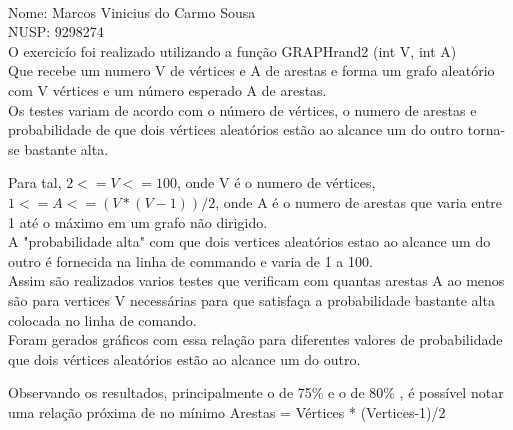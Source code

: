 \documentclass{article}
\begin{document}
\quad\\
Nome: Marcos Vinicius do Carmo Sousa\\
NUSP: 9298274\\

O exercicío foi realizado utilizando a função GRAPHrand2 (int V, int A)\\
Que recebe um numero V de vértices e A de arestas e forma um grafo aleatório
com V vértices e um número esperado A de arestas.\\
Os testes variam de acordo com o número de vértices, o numero de arestas e \\
probabilidade de que dois vértices aleatórios estão ao alcance um do outro torna-se bastante alta.

Para tal, $2<=V<=100$, onde V é o numero de vértices, $1<=A<=(V*(V-1))/2$, onde A é o numero de arestas que varia entre 1 até o máximo em um grafo não dirigido.\\
A "probabilidade alta" com que dois vertices aleatórios estao ao alcance um do outro é fornecida na linha de commando e varia de 1 a 100. \\
Assim são realizados varios testes que verificam com quantas arestas A ao menos são para vertices V necessárias para que satisfaça a probabilidade bastante alta colocada no linha de comando.\\

Foram gerados gráficos com essa relação para diferentes valores de probabilidade que dois vértices aleatórios estão ao alcance um do outro.


Observando os resultados, principalmente o de 75\% e o de 80\% , é possível notar uma relação próxima de no mínimo Arestas = Vértices * (Vertices-1)/2 \\
\end{document}
